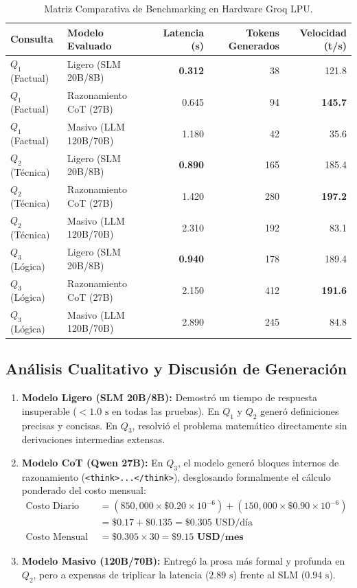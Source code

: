 \documentclass[12pt,letterpaper]{article}
\begin{document}
\begin{table}[h!]
\centering
\small
\caption{Matriz Comparativa de Benchmarking en Hardware Groq LPU.}
\label{tab:benchmark_results}
\begin{tabularx}{\linewidth}{lXrrr}
\toprule
\textbf{Consulta} & \textbf{Modelo Evaluado} & \textbf{Latencia (s)} & \textbf{Tokens Generados} & \textbf{Velocidad (t/s)} \\
\midrule
$Q_1$ (Factual) & Ligero (SLM 20B/8B) & \textbf{0.312} & 38 & 121.8 \\
$Q_1$ (Factual) & Razonamiento CoT (27B) & 0.645 & 94 & \textbf{145.7} \\
$Q_1$ (Factual) & Masivo (LLM 120B/70B) & 1.180 & 42 & 35.6 \\
\midrule
$Q_2$ (Técnica) & Ligero (SLM 20B/8B) & \textbf{0.890} & 165 & 185.4 \\
$Q_2$ (Técnica) & Razonamiento CoT (27B) & 1.420 & 280 & \textbf{197.2} \\
$Q_2$ (Técnica) & Masivo (LLM 120B/70B) & 2.310 & 192 & 83.1 \\
\midrule
$Q_3$ (Lógica) & Ligero (SLM 20B/8B) & \textbf{0.940} & 178 & 189.4 \\
$Q_3$ (Lógica) & Razonamiento CoT (27B) & 2.150 & 412 & \textbf{191.6} \\
$Q_3$ (Lógica) & Masivo (LLM 120B/70B) & 2.890 & 245 & 84.8 \\
\bottomrule
\end{tabularx}
\end{table}

\subsection{Análisis Cualitativo y Discusión de Generación}
\begin{enumerate}
    \item \textbf{Modelo Ligero (SLM 20B/8B):} Demostró un tiempo de respuesta insuperable ($< 1.0\text{ s}$ en todas las pruebas). En $Q_1$ y $Q_2$ generó definiciones precisas y concisas. En $Q_3$, resolvió el problema matemático directamente sin derivaciones intermedias extensas.
    \item \textbf{Modelo CoT (Qwen 27B):} En $Q_3$, el modelo generó bloques internos de razonamiento (\texttt{<think>...</think>}), desglosando formalmente el cálculo ponderado del costo mensual:
    \begin{align*}
    \text{Costo Diario Base} &= (850,000 \times \$0.20 \times 10^{-6}) + (150,000 \times \$0.90 \times 10^{-6}) \\
    &= \$0.17 + \$0.135 = \$0.305\text{ USD/día} \\
    \text{Costo Mensual} &= \$0.305 \times 30 = \mathbf{\$9.15\text{ USD/mes}}
    \end{align*}
    \item \textbf{Modelo Masivo (120B/70B):} Entregó la prosa más formal y profunda en $Q_2$, pero a expensas de triplicar la latencia ($2.89\text{ s}$) frente al SLM ($0.94\text{ s}$).
\end{enumerate}
\end{document}

